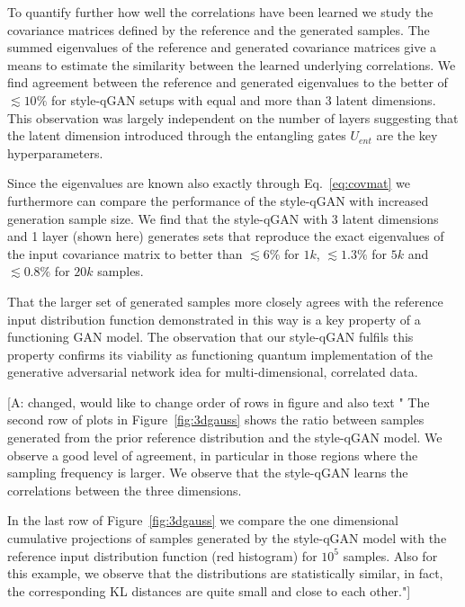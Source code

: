 \documentclass[twocolumn,preprintnumbers,superscriptaddress]{revtex4-2}
\newcommand{\commentAF}[1]{{\color{cyan} {[A: #1]}}}
\begin{document}
To quantify further how well the correlations have been learned we study the covariance matrices defined by the reference and the generated samples. The summed eigenvalues of the reference and generated covariance matrices give a means to estimate the similarity between the learned underlying correlations. We find agreement between the reference and generated eigenvalues to the better of $\lesssim10\%$ for style-qGAN setups with equal and more than 3 latent dimensions. This observation was largely independent on the number of layers suggesting that the latent dimension introduced through the entangling gates $U_{ent}$ are the key hyperparameters.

Since the eigenvalues are known also exactly through Eq.~\ref{eq:covmat} we furthermore can compare the performance of the style-qGAN with increased generation sample size. We find that the style-qGAN with 3 latent dimensions and 1 layer (shown here)
generates sets that reproduce the exact eigenvalues of the input covariance matrix to better than $\lesssim 6\%$ for $1k$, $\lesssim 1.3\%$ for $5k$ and $\lesssim 0.8\%$ for $20k$ samples.

That the larger set of generated samples more closely agrees with the reference input distribution function demonstrated in this way is a key property of a functioning GAN model. The observation that our style-qGAN fulfils this property confirms its viability as functioning quantum implementation of the generative adversarial network idea for multi-dimensional, correlated data.

\commentAF{changed, would like to change order of rows in figure and also text "
The second row of plots in Figure~\ref{fig:3dgauss} shows the ratio between
samples generated from the prior reference distribution and the style-qGAN model. We
observe a good level of agreement, in particular in those regions where the
sampling frequency is larger. We observe that the style-qGAN learns the correlations
between the three dimensions.

In the last row of Figure~\ref{fig:3dgauss} we compare the one dimensional
cumulative projections of samples generated by the style-qGAN model with the
reference input distribution function (red histogram) for $10^5$ samples. Also
for this example, we observe that the distributions are statistically similar,
in fact, the corresponding KL distances are quite small and close to each other."}
\end{document}
